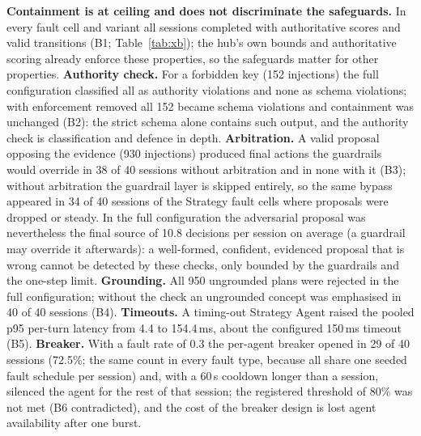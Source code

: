 \textbf{Containment is at ceiling and does not discriminate the safeguards.} In every fault cell and variant all sessions completed with authoritative scores and valid transitions (B1; Table~\ref{tab:xb}); the hub's own bounds and authoritative scoring already enforce these properties, so the safeguards matter for other properties. \textbf{Authority check.} For a forbidden key (152 injections) the full configuration classified all as authority violations and none as schema violations; with enforcement removed all 152 became schema violations and containment was unchanged (B2): the strict schema alone contains such output, and the authority check is classification and defence in depth. \textbf{Arbitration.} A valid proposal opposing the evidence (930 injections) produced final actions the guardrails would override in 38 of 40 sessions without arbitration and in none with it (B3); without arbitration the guardrail layer is skipped entirely, so the same bypass appeared in 34 of 40 sessions of the Strategy fault cells where proposals were dropped or steady. In the full configuration the adversarial proposal was nevertheless the final source of 10.8 decisions per session on average (a guardrail may override it afterwards): a well-formed, confident, evidenced proposal that is wrong cannot be detected by these checks, only bounded by the guardrails and the one-step limit. \textbf{Grounding.} All 950 ungrounded plans were rejected in the full configuration; without the check an ungrounded concept was emphasised in 40 of 40 sessions (B4). \textbf{Timeouts.} A timing-out Strategy Agent raised the pooled p95 per-turn latency from 4.4 to 154.4\,ms, about the configured 150\,ms timeout (B5). \textbf{Breaker.} With a fault rate of 0.3 the per-agent breaker opened in 29 of 40 sessions (72.5\%; the same count in every fault type, because all share one seeded fault schedule per session) and, with a 60\,s cooldown longer than a session, silenced the agent for the rest of that session; the registered threshold of 80\% was not met (B6 contradicted), and the cost of the breaker design is lost agent availability after one burst.

